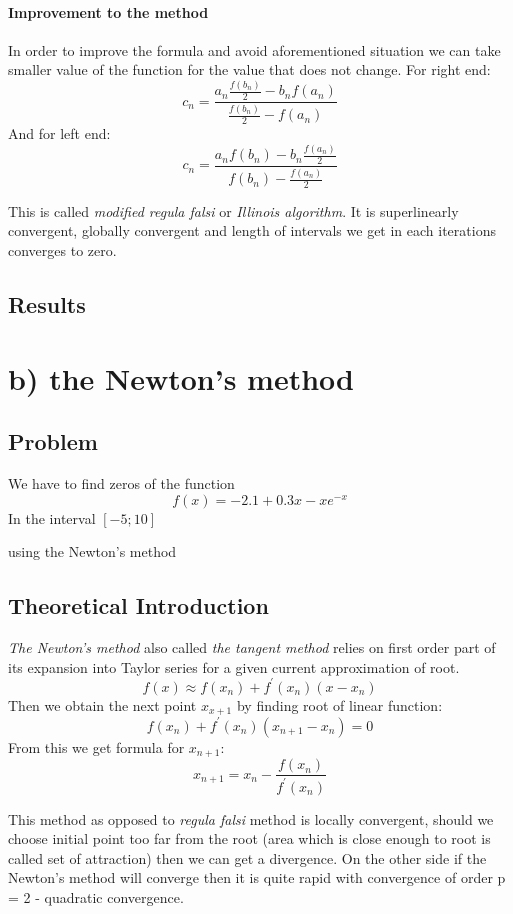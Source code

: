 \documentclass[12pt]{report}
\begin{document}
\paragraph{Improvement to the method}
In order to improve the formula and avoid aforementioned situation we can take smaller value of the function for the value that does not change.
For right end:
\[ c_n = \frac{a_n\frac{f(b_n)}{2} - b_nf(a_n)}{\frac{f(b_n)}{2} - f(a_n)} \]
And for left end:
\[ c_n = \frac{a_nf(b_n) - b_n\frac{f(a_n)}{2}}{f(b_n)- \frac{f(a_n)}{2}} \]

This is called \emph{modified regula falsi} or \emph{Illinois algorithm}.
It is superlinearly convergent, globally convergent and length of intervals we get in each iterations converges to zero.
\subsection{Results}

\section{b) the Newton's method}


\subsection{Problem}

We have to find zeros of the function
\[ f(x) = -2.1 + 0.3x - xe^{-x} \]
In the interval $[-5; 10]$

using the Newton's method
\subsection{Theoretical Introduction}
\emph{The Newton's method} also called \emph{the tangent method} relies on first order part of its expansion into Taylor series for a given current approximation of root.
\[ f(x) \approx f(x_n) + f^{'}(x_n)(x-x_n) \]
Then we obtain the next point $x_{x+1}$ by finding root of linear function:
\[ f(x_n) + f^{'}(x_n)(x_{n+1}-x_n) = 0 \]
From this we get formula for $x_{n+1}$:
\[ x_{n+1} = x_n - \frac{f(x_n)}{f^{'}(x_n)} \]

This method as opposed to \emph{regula falsi} method is locally convergent, should we choose initial point too far from the root (area which is close enough to root is called set of attraction) then we can get a divergence. On the other side if the Newton's method will converge then it is quite rapid with convergence of order p = 2 - quadratic convergence.
\end{document}
